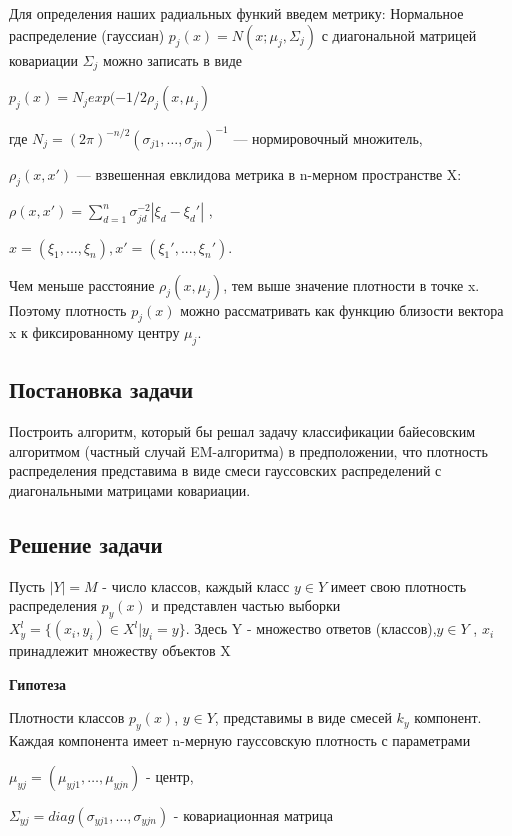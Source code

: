 Для определения наших радиальных функий введем метрику:
Нормальное распределение (гауссиан) $p_j(x) = N(x; \mu _j ,\Sigma _j)$ с диагональной матрицей ковариации $\Sigma _j$ можно записать в виде


$p_j(x) = N_j exp(-1/2 \rho  _j (x, \mu _j)$



где $N_j = (2\pi)^ {-n/2}(\sigma _{j1}, \dots ,\sigma _{jn})^{-1}$ — нормировочный множитель,

$\rho _j(x, x')$ — взвешенная евклидова метрика в n-мерном пространстве X:

$\rho (x, x') = \sum ^n _{d = 1} \sigma ^{-2} _{jd} |\xi _d - \xi _d '|$ ,

 $x = (\xi _1, . . . ,\xi _n), x' = (\xi _1 ', . . . , \xi _n').$

Чем меньше расстояние $\rho_j(x, \mu _j)$, тем выше значение плотности в точке x. Поэтому плотность $p _j(x)$ можно рассматривать как функцию близости вектора x к фиксированному центру $\mu_j$.

\subsection*{Постановка задачи}

Построить алгоритм, который бы решал задачу классификации байесовским алгоритмом (частный случай EM-алгоритма) в предположении, что плотность распределения представима в виде смеси гауссовских распределений с диагональными матрицами ковариации.

\subsection*{Решение задачи}

Пусть  $|Y| = M$ - число классов, каждый класс $y \in Y$ имеет свою плотность распределения $p_y(x)$ и представлен частью выборки $X ^l _y = \{(x_i, y_i) \in X ^l | y_i = y \}.$
Здесь Y - множество ответов (классов),$y \in Y$ , $x_i$ принадлежит множеству объектов X

\textbf{Гипотеза}

Плотности классов $p_y(x)$, $y \in Y $, представимы в виде смесей $k_y$ компонент. Каждая компонента имеет n-мерную гауссовскую плотность с параметрами

$\mu _{yj} = (\mu _{yj1}, \dots , \mu _{yjn}) $ - центр,

$\Sigma _{yj} = diag(\sigma  _{yj1}, \dots , \sigma  _{yjn})$ - ковариационная матрица

